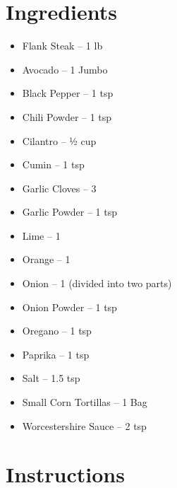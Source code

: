




\section*{Ingredients}

\begin{itemize}
      \item Flank Steak – 1 lb
      \item[\cut] Avocado – 1 Jumbo
      \item[\measure] Black Pepper – 1 tsp
      \item[\measure] Chili Powder – 1 tsp
      \item[\cut] Cilantro – ½ cup
      \item[\measure] Cumin – 1 tsp
      \item[\cut] Garlic Cloves – 3
      \item[\measure] Garlic Powder – 1 tsp
      \item[\measure] Lime – 1
      \item[\measure] Orange – 1
      \item[\cut] Onion – 1 (divided into two parts)
      \item[\measure] Onion Powder – 1 tsp
      \item[\measure] Oregano – 1 tsp
      \item[\measure] Paprika – 1 tsp
      \item[\measure] Salt – 1.5 tsp
      \item Small Corn Tortillas – 1 Bag
      \item[\measure] Worcestershire Sauce – 2 tsp
\end{itemize}

\newpage
{}
\section*{Instructions}

